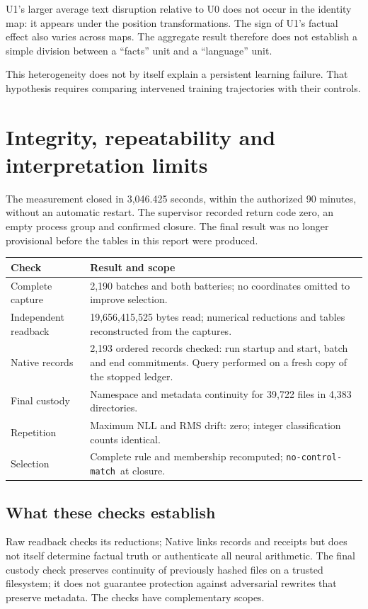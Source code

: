 \documentclass[11pt,a4paper]{article}
\newcommand{\status}{\texttt{no-control-match}}
\newcommand{\pageend}{\clearpage}
\begin{document}
U1's larger average text disruption relative to U0 does not occur in the
identity map: it appears under the position transformations. The sign of U1's
factual effect also varies across maps. The aggregate result therefore does
not establish a simple division between a ``facts'' unit and a ``language'' unit.

This heterogeneity does not by itself explain a persistent learning failure.
That hypothesis requires comparing intervened training trajectories with their
controls.

\pageend
\section{Integrity, repeatability and interpretation limits}
\label{sec:integrity}

The measurement closed in 3,046.425 seconds, within the authorized 90 minutes,
without an automatic restart. The supervisor recorded return code zero, an
empty process group and confirmed closure. The final result was no longer
provisional before the tables in this report were produced.

\begin{tabularx}{\linewidth}{@{}p{47mm}Y@{}}
\toprule
\textbf{Check} & \textbf{Result and scope}\\
\midrule
Complete capture & 2,190 batches and both batteries; no coordinates omitted to improve selection.\\
Independent readback & 19,656,415,525 bytes read; numerical reductions and tables reconstructed from the captures.\\
Native records & 2,193 ordered records checked: run startup and start, batch and end commitments. Query performed on a fresh copy of the stopped ledger.\\
Final custody & Namespace and metadata continuity for 39,722 files in 4,383 directories.\\
Repetition & Maximum NLL and RMS drift: zero; integer classification counts identical.\\
Selection & Complete rule and membership recomputed; \status\ at closure.\\
\bottomrule
\end{tabularx}

\subsection{What these checks establish}
Raw readback checks its reductions; Native links records and receipts but does
not itself determine factual truth or authenticate all neural arithmetic. The
final custody check preserves continuity of previously hashed files on a trusted
filesystem; it does not guarantee protection against adversarial rewrites that
preserve metadata. The checks have complementary scopes.
\end{document}
